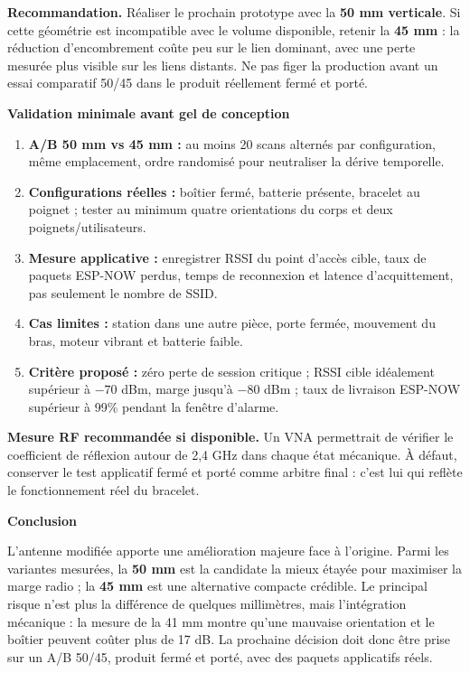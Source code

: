 \documentclass[10pt,a4paper]{article}
\begin{document}
\vspace{4mm}
\begin{decisionbox}
\textbf{Recommandation.} Réaliser le prochain prototype avec la \textbf{50 mm verticale}. Si cette géométrie est incompatible avec le volume disponible, retenir la \textbf{45 mm} : la réduction d'encombrement coûte peu sur le lien dominant, avec une perte mesurée plus visible sur les liens distants. Ne pas figer la production avant un essai comparatif 50/45 dans le produit réellement fermé et porté.
\end{decisionbox}

\vspace{4mm}
\textbf{Validation minimale avant gel de conception}
\begin{enumerate}[leftmargin=7mm,itemsep=3pt,topsep=2pt]
  \item \textbf{A/B 50 mm vs 45 mm :} au moins 20 scans alternés par configuration, même emplacement, ordre randomisé pour neutraliser la dérive temporelle.
  \item \textbf{Configurations réelles :} boîtier fermé, batterie présente, bracelet au poignet ; tester au minimum quatre orientations du corps et deux poignets/utilisateurs.
  \item \textbf{Mesure applicative :} enregistrer RSSI du point d'accès cible, taux de paquets ESP-NOW perdus, temps de reconnexion et latence d'acquittement, pas seulement le nombre de SSID.
  \item \textbf{Cas limites :} station dans une autre pièce, porte fermée, mouvement du bras, moteur vibrant et batterie faible.
  \item \textbf{Critère proposé :} zéro perte de session critique ; RSSI cible idéalement supérieur à \(-70\) dBm, marge jusqu'à \(-80\) dBm ; taux de livraison ESP-NOW supérieur à 99\% pendant la fenêtre d'alarme.
\end{enumerate}

\begin{warningbox}
\textbf{Mesure RF recommandée si disponible.} Un VNA permettrait de vérifier le coefficient de réflexion autour de 2,4 GHz dans chaque état mécanique. À défaut, conserver le test applicatif fermé et porté comme arbitre final : c'est lui qui reflète le fonctionnement réel du bracelet.
\end{warningbox}

\vspace{3mm}
\textbf{Conclusion}

L'antenne modifiée apporte une amélioration majeure face à l'origine. Parmi les variantes mesurées, la \textbf{50 mm} est la candidate la mieux étayée pour maximiser la marge radio ; la \textbf{45 mm} est une alternative compacte crédible. Le principal risque n'est plus la différence de quelques millimètres, mais l'intégration mécanique : la mesure de la 41 mm montre qu'une mauvaise orientation et le boîtier peuvent coûter plus de 17 dB. La prochaine décision doit donc être prise sur un A/B 50/45, produit fermé et porté, avec des paquets applicatifs réels.
\end{document}

